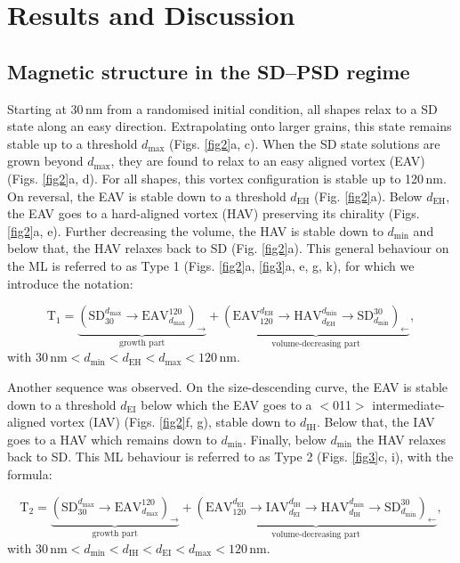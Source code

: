 \documentclass[review,authoryear]{elsarticle}
\newcommand{\dmax}{d_\text{max}}
\newcommand{\dmin}{d_\text{min}}
\newcommand{\nm}{\,\text{nm}}
\begin{document}
\section{Results and Discussion}
\subsection{Magnetic structure in the SD--PSD regime}\label{sd-psd}
Starting at 30$\nm$ from a randomised initial condition, all shapes relax to a SD state along an easy direction. Extrapolating onto larger grains, this state remains stable up to a threshold $\dmax$ (Figs. \ref{fig2}a, c). When the SD state solutions are grown beyond $\dmax$, they are found to relax to an easy aligned vortex (EAV) (Figs. \ref{fig2}a, d). For all shapes, this vortex configuration is stable up to 120$\nm$. On reversal, the EAV is stable down to a threshold $d_{\text{EH}}$ (Fig. \ref{fig2}a). Below $d_{\text{EH}}$, the EAV goes to a hard-aligned vortex (HAV) preserving its chirality (Figs. \ref{fig2}a, e). Further decreasing the volume, the HAV is stable down to $\dmin$ and below that, the HAV relaxes back to SD (Fig. \ref{fig2}a). This general behaviour on the ML is referred to as Type 1 (Figs. \ref{fig2}a, \ref{fig3}a, e, g, k), for which we introduce the notation:
{\par\nobreak\noindent}
\begin{equation}\label{type1}
\text{T}_1=\underbrace{\left(\text{SD}_{30}^{\dmax}\rightarrow\text{EAV}_{\dmax}^{120}\right)_{\rightarrow}}_\text{growth part} +
\underbrace{\left(\text{EAV}_{120}^{d_{\text{EH}}}\rightarrow\text{HAV}_{d_{\text{EH}}}^{\dmin}\rightarrow\text{SD}_{\dmin}^{30}\right)_{\leftarrow}}_\text{volume-decreasing part},
\end{equation}
with $30\,\text{nm}<\dmin<d_{\text{EH}}<\dmax<120\,\text{nm}$.\par

Another sequence was observed. On the size-descending curve, the EAV is stable down to a threshold $d_{\text{EI}}$ below which the EAV goes to a $<$011$>$ intermediate-aligned vortex (IAV) (Figs. \ref{fig2}f, g), stable down to $d_{\text{IH}}$. Below that, the IAV goes to a HAV which remains down to $\dmin$. Finally, below $\dmin$ the HAV relaxes back to SD. This ML behaviour is referred to as Type 2 (Figs. \ref{fig3}c, i), with the formula:
{\par\nobreak\noindent}
\begin{equation}\label{type2}
\text{T}_2=\underbrace{\left(\text{SD}_{30}^{\dmax}\rightarrow\text{EAV}_{\dmax}^{120}\right)_{\rightarrow}}_\text{growth part} +
\underbrace{\left(\text{EAV}_{120}^{d_{\text{EI}}}\rightarrow\text{IAV}_{d_{\text{EI}}}^{d_{\text{IH}}}\rightarrow\text{HAV}_{d_{\text{IH}}}^{\dmin}\rightarrow\text{SD}_{\dmin}^{30}\right)_{\leftarrow}}_\text{volume-decreasing part},
\end{equation}
with $30\,\text{nm}<\dmin<d_{\text{IH}}<d_{\text{EI}}<\dmax<120\,\text{nm}$.\par
\end{document}
